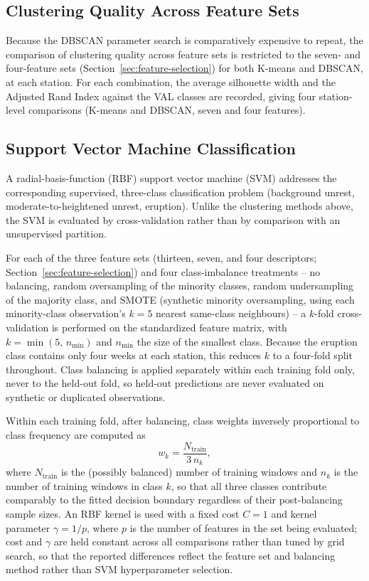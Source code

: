 \documentclass[11pt,a4paper]{article}
\begin{document}
\subsection{Clustering Quality Across Feature Sets}\label{sec:methods-clustering-comparison}

Because the DBSCAN parameter search is comparatively expensive to repeat, the comparison of clustering quality across feature sets is restricted to the seven- and four-feature sets (Section~\ref{sec:feature-selection}) for both K-means and DBSCAN, at each station. For each combination, the average silhouette width and the Adjusted Rand Index against the VAL classes are recorded, giving four station-level comparisons (K-means and DBSCAN, seven and four features).

\subsection{Support Vector Machine Classification}\label{sec:methods-svm}

A radial-basis-function (RBF) support vector machine (SVM) addresses the corresponding supervised, three-class classification problem (background unrest, moderate-to-heightened unrest, eruption). Unlike the clustering methods above, the SVM is evaluated by cross-validation rather than by comparison with an unsupervised partition.

For each of the three feature sets (thirteen, seven, and four descriptors; Section~\ref{sec:feature-selection}) and four class-imbalance treatments -- no balancing, random oversampling of the minority classes, random undersampling of the majority class, and SMOTE (synthetic minority oversampling, using each minority-class observation's $k=5$ nearest same-class neighbours) -- a $k$-fold cross-validation is performed on the standardized feature matrix, with $k=\min(5,\,n_{\min})$ and $n_{\min}$ the size of the smallest class. Because the eruption class contains only four weeks at each station, this reduces $k$ to a four-fold split throughout. Class balancing is applied separately within each training fold only, never to the held-out fold, so held-out predictions are never evaluated on synthetic or duplicated observations.

Within each training fold, after balancing, class weights inversely proportional to class frequency are computed as
\begin{equation}
	w_k = \frac{N_{\mathrm{train}}}{3\,n_k},
\end{equation}
where $N_{\mathrm{train}}$ is the (possibly balanced) number of training windows and $n_k$ is the number of training windows in class $k$, so that all three classes contribute comparably to the fitted decision boundary regardless of their post-balancing sample sizes. An RBF kernel is used with a fixed cost $C=1$ and kernel parameter $\gamma = 1/p$, where $p$ is the number of features in the set being evaluated; cost and $\gamma$ are held constant across all comparisons rather than tuned by grid search, so that the reported differences reflect the feature set and balancing method rather than SVM hyperparameter selection.
\end{document}
